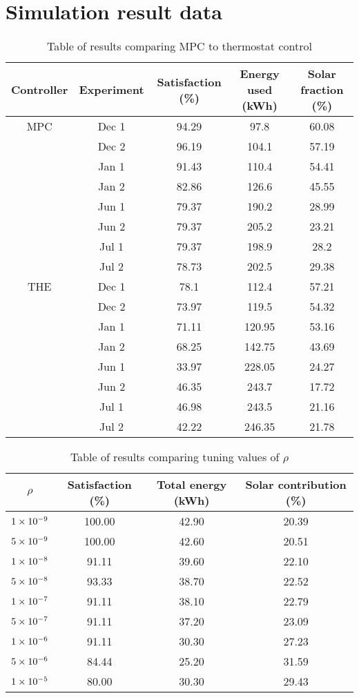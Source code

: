 \chapter{Simulation result data}
\label{app:data}

\begin{table}
   \centering
   \begin{tabular}{c c c c c}
      Controller & Experiment & Satisfaction (\%) & Energy used (kWh) & Solar fraction (\%) \\ \hline
      MPC & Dec 1 & 94.29 & 97.8   & 60.08 \\
          & Dec 2 & 96.19 & 104.1  & 57.19 \\
          & Jan 1 & 91.43 & 110.4  & 54.41 \\
          & Jan 2 & 82.86 & 126.6  & 45.55 \\
          & Jun 1 & 79.37 & 190.2  & 28.99 \\
          & Jun 2 & 79.37 & 205.2  & 23.21 \\
          & Jul 1 & 79.37 & 198.9  & 28.2  \\
          & Jul 2 & 78.73 & 202.5  & 29.38 \\
      THE & Dec 1 & 78.1  & 112.4  & 57.21 \\
          & Dec 2 & 73.97 & 119.5  & 54.32 \\
          & Jan 1 & 71.11 & 120.95 & 53.16 \\
          & Jan 2 & 68.25 & 142.75 & 43.69 \\
          & Jun 1 & 33.97 & 228.05 & 24.27 \\
          & Jun 2 & 46.35 & 243.7  & 17.72 \\
          & Jul 1 & 46.98 & 243.5  & 21.16 \\
          & Jul 2 & 42.22 & 246.35 & 21.78
   \end{tabular}
   \caption{Table of results comparing MPC to thermostat control}
   \label{tab:comparison}
\end{table}

\begin{table}
   \centering
   \begin{tabular}{c c c c}
      $\rho$ & Satisfaction (\%) & Total energy (kWh) & Solar contribution (\%) \\ \hline
      $1\times 10^{-9}$ & 100.00 & 42.90 & 20.39 \\
      $5\times 10^{-9}$ & 100.00 & 42.60 & 20.51 \\
      $1\times 10^{-8}$ & 91.11 & 39.60 & 22.10 \\
      $5\times 10^{-8}$ & 93.33 & 38.70 & 22.52 \\
      $1\times 10^{-7}$ & 91.11 & 38.10 & 22.79 \\
      $5\times 10^{-7}$ & 91.11 & 37.20 & 23.09 \\
      $1\times 10^{-6}$ & 91.11 & 30.30 & 27.23 \\
      $5\times 10^{-6}$ & 84.44 & 25.20 & 31.59 \\
      $1\times 10^{-5}$ & 80.00 & 30.30 & 29.43 \\
   \end{tabular}
   \caption{Table of results comparing tuning values of $\rho$}
   \label{tab:rho}
\end{table}
